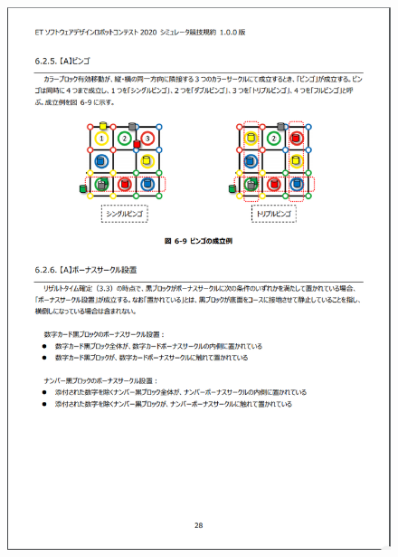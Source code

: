 \documentclass[uplatex, report, a4j, 10pt]{jsbook}
\begin{document}
\begin{figure}[tp]
    \begin{center}
    \includegraphics[width=\hsize]{specification/ET_15.eps}
    \end{center}
\end{figure}
\end{document}
